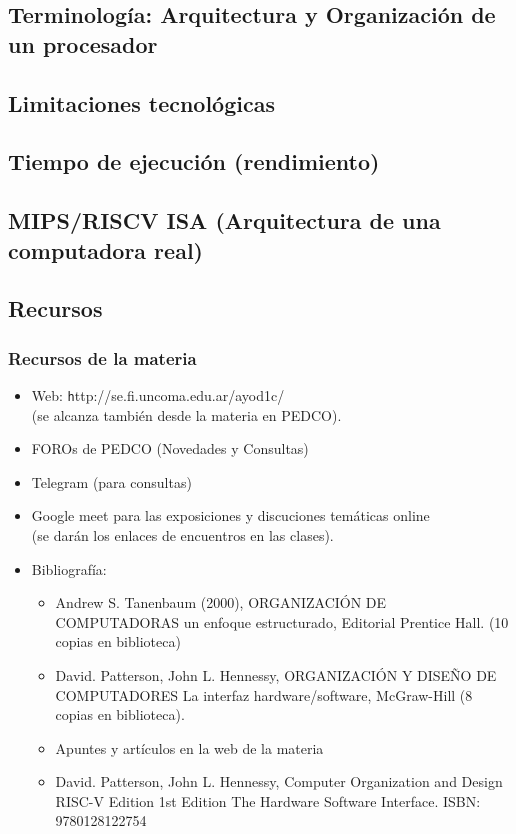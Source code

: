 \documentclass[aspectratio=169,compress]{beamer}
\begin{document}
\subsection{Terminología: Arquitectura y Organización de un procesador}


\subsection{Limitaciones tecnológicas}
\subsection{Tiempo de ejecución (rendimiento)}
\subsection{MIPS/RISCV ISA (Arquitectura de una computadora real)}



\subsection{Recursos}

\begin{frame}[fragile]
  \frametitle{Recursos de la materia}

\begin{small}
\begin{itemize}

\item Web: \footnotesize{\texttt http://se.fi.uncoma.edu.ar/ayod1c/}\\
(se alcanza también desde la materia en PEDCO).

\item FOROs de PEDCO (Novedades y Consultas)
\item Telegram (para consultas)
\item Google meet para las exposiciones y discuciones temáticas online\\ (se darán los enlaces de encuentros en las clases).
\item Bibliografía:

\begin{itemize}

\item Andrew S. Tanenbaum (2000), ORGANIZACIÓN DE COMPUTADORAS un enfoque estructurado, Editorial Prentice Hall. (10 copias en biblioteca)
\item David. Patterson, John L. Hennessy, ORGANIZACIÓN Y DISEÑO DE COMPUTADORES La interfaz hardware/software, McGraw-Hill (8 copias en biblioteca).
\item Apuntes y artículos en la web de la materia
\item David. Patterson, John L. Hennessy, Computer Organization and Design RISC-V Edition 1st Edition The Hardware Software Interface. ISBN: 9780128122754

\end{itemize}

\end{itemize}
\end{small}

\end{frame}
\end{document}
